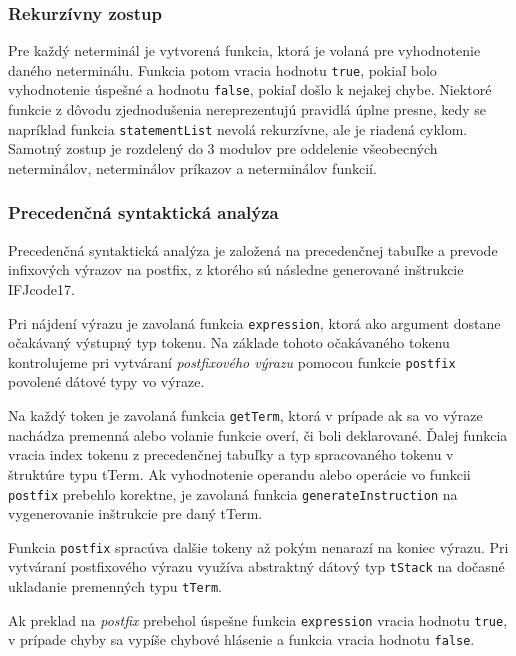 \documentclass{article}
\begin{document}
            \subsubsection{Rekurzívny zostup}
                Pre každý neterminál je vytvorená funkcia, ktorá je volaná pre vyhodnotenie daného neterminálu.
                Funkcia potom vracia hodnotu \texttt{true}, pokiaľ bolo vyhodnotenie úspešné a hodnotu \texttt{false}, pokiaľ došlo k nejakej chybe. Niektoré funkcie z dôvodu zjednodušenia nereprezentujú pravidlá úplne presne, kedy se napríklad funkcia \texttt{statementList} nevolá rekurzívne, ale je riadená cyklom. Samotný zostup je rozdelený do 3 modulov pre oddelenie všeobecných neterminálov, neterminálov príkazov a neterminálov funkcií.
            
            \subsubsection{Precedenčná syntaktická analýza}
                Precedenčná syntaktická analýza je založená na precedenčnej tabuľke a prevode infixových výrazov
                na postfix, z ktorého sú následne generované inštrukcie IFJcode17. 

                Pri nájdení výrazu je zavolaná funkcia \texttt{expression}, ktorá ako argument dostane očakávaný
                výstupný typ tokenu. Na základe tohoto očakávaného tokenu kontrolujeme pri vytváraní \emph{postfixového 
                výrazu} pomocou funkcie \texttt{postfix} povolené dátové typy vo výraze. 

                Na každý token je zavolaná funkcia \texttt{getTerm}, ktorá v prípade ak sa vo výraze nachádza premenná 
                alebo volanie funkcie overí, či boli deklarované. Ďalej funkcia vracia index tokenu z precedenčnej tabuľky 
                a typ spracovaného tokenu v štruktúre typu tTerm. Ak vyhodnotenie operandu alebo operácie vo funkcii 
                \texttt{postfix} prebehlo korektne, je zavolaná funkcia \texttt{generateInstruction} na vygenerovanie 
                inštrukcie pre daný tTerm. 

                Funkcia \texttt{postfix} spracúva dalšie tokeny až pokým nenarazí na koniec výrazu. 
                Pri vytváraní postfixového výrazu využíva abstraktný dátový typ \texttt{tStack} na dočasné ukladanie 
                premenných typu \texttt{tTerm}. 

                Ak preklad na \emph{postfix} prebehol úspešne funkcia \texttt{expression} vracia hodnotu \texttt{true}, 
                v prípade chyby sa vypíše chybové hlásenie a funkcia vracia hodnotu \texttt{false}.
    
\end{document}
